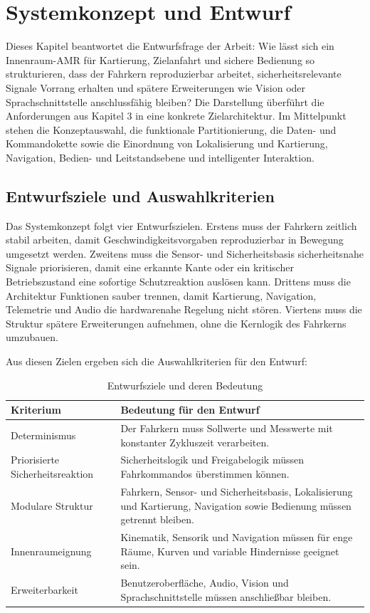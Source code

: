 \chapter{Systemkonzept und Entwurf}

Dieses Kapitel beantwortet die Entwurfsfrage der Arbeit: Wie lässt sich ein Innenraum-AMR für Kartierung, Zielanfahrt und sichere Bedienung so strukturieren, dass der Fahrkern reproduzierbar arbeitet, sicherheitsrelevante Signale Vorrang erhalten und spätere Erweiterungen wie Vision oder Sprachschnittstelle anschlussfähig bleiben? Die Darstellung überführt die Anforderungen aus Kapitel 3 in eine konkrete Zielarchitektur. Im Mittelpunkt stehen die Konzeptauswahl, die funktionale Partitionierung, die Daten- und Kommandokette sowie die Einordnung von Lokalisierung und Kartierung, Navigation, Bedien- und Leitstandsebene und intelligenter Interaktion.

\section{Entwurfsziele und Auswahlkriterien}

Das Systemkonzept folgt vier Entwurfszielen. Erstens muss der Fahrkern zeitlich stabil arbeiten, damit Geschwindigkeitsvorgaben reproduzierbar in Bewegung umgesetzt werden. Zweitens muss die Sensor- und Sicherheitsbasis sicherheitsnahe Signale priorisieren, damit eine erkannte Kante oder ein kritischer Betriebszustand eine sofortige Schutzreaktion auslösen kann. Drittens muss die Architektur Funktionen sauber trennen, damit Kartierung, Navigation, Telemetrie und Audio die hardwarenahe Regelung nicht stören. Viertens muss die Struktur spätere Erweiterungen aufnehmen, ohne die Kernlogik des Fahrkerns umzubauen.

Aus diesen Zielen ergeben sich die Auswahlkriterien für den Entwurf:

\begin{table}[htbp]
  \centering
  \caption{Entwurfsziele und deren Bedeutung}
  \small
  \begin{tabularx}{\textwidth}{l X}
    \toprule
    \textbf{Kriterium} & \textbf{Bedeutung für den Entwurf} \\
    \midrule
    Determinismus & Der Fahrkern muss Sollwerte und Messwerte mit konstanter Zykluszeit verarbeiten. \\
    \addlinespace
    Priorisierte Sicherheitsreaktion & Sicherheitslogik und Freigabelogik müssen Fahrkommandos überstimmen können. \\
    \addlinespace
    Modulare Struktur & Fahrkern, Sensor- und Sicherheitsbasis, Lokalisierung und Kartierung, Navigation sowie Bedienung müssen getrennt bleiben. \\
    \addlinespace
    Innenraumeignung & Kinematik, Sensorik und Navigation müssen für enge Räume, Kurven und variable Hindernisse geeignet sein. \\
    \addlinespace
    Erweiterbarkeit & Benutzeroberfläche, Audio, Vision und Sprachschnittstelle müssen anschließbar bleiben. \\
    \bottomrule
  \end{tabularx}
\end{table}

